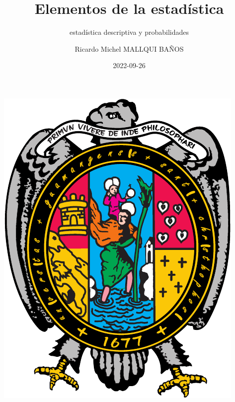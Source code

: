 \documentclass[
  11pt,
]{krantz}
\title{Elementos de la estadística}
\subtitle{estadística descriptiva y probabilidades}
\author{Ricardo Michel MALLQUI BAÑOS}
\date{2022-09-26}
\theoremstyle{definition}
\theoremstyle{definition}
\theoremstyle{definition}
\theoremstyle{definition}
\theoremstyle{remark}
\begin{document}
\maketitle

\thispagestyle{empty}
\begin{center}
\includegraphics{U.pdf}
\end{center}


{
\hypersetup{linkcolor=}
\setcounter{tocdepth}{2}
\tableofcontents
}
\listoftables
\listoffigures
\newcommand{\N}{\mathbb{N}}
\newcommand{\R}{\mathbb{R}}
\newcommand{\CC}{\mathbb{C}}
\newcommand{\I}{\mathbb{I}}
\newcommand{\f}{\mathbb{f}}
\newcommand{\X}{\mathbb{X}}
\newcommand{\D}{\mathbb{D}}
\newcommand{\Z}{\mathbb{Z}}
\newcommand{\Q}{\mathbb{Q}}
\newcommand{\norm}[1]{\left\Vert#1\right\Vert}
\newcommand{\abs}[1]{\left\vert#1\right\vert}
\newcommand{\set}[1]{\left\{#1\right\}}
\newcommand{\seq}[1]{\left<#1\right>}
\newcommand{\co}[1]{\left[#1\right]}
\newcommand{\cc}[1]{\left(#1\right)}
\newcommand{\J}{\mathcal{J}}
\newcommand{\K}{\mathcal{K}}
\newcommand{\M}{\mathcal{M}}
\newcommand{\F}{\mathcal{F}}
\end{document}
